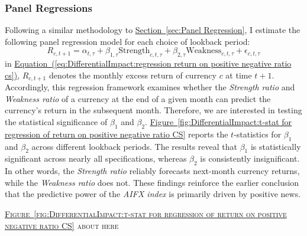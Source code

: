 \documentclass[12pt,oneside,letter]{article}
\newcommand*{\myfig}[1]{\hyperref[{#1}]{Figure~\ref*{#1}}}
\newcommand*{\mysec}[1]{\hyperref[{#1}]{Section~\ref*{#1}}}
\newcommand*{\myeq}[1]{\hyperref[{#1}]{Equation~(\ref*{#1})}}
\begin{document}
		\subsubsection{Panel Regressions}		\label{sec:Panel Regressions: Pos_neg_ratio}
		Following a similar methodology to \mysec{sec:Panel Regression}, I estimate the following panel regression model for each choice of lookback period:
		\begin{equation}
			R_{c,t+1} = \alpha_{t,\tau} +  \beta_{1,\tau} \text{Strength}_{c,t,\tau} + \beta_{2,\tau} \text{Weakness}_{c,t,\tau} + \epsilon_{c,t,\tau}
			\label{eq:DifferentialImpact:regression return on positive negative ratio cs}
		\end{equation}
		in \myeq{eq:DifferentialImpact:regression return on positive negative ratio cs}, \(R_{c,t+1}\) denotes the monthly excess return of currency \(c\) at time \(t+1\). Accordingly, this regression framework examines whether the \textit{Strength ratio} and \textit{Weakness ratio} of a currency at the end of a given month can predict the currency's return in the subsequent month. Therefore, we are interested in testing the statistical significance of \(\beta_1\) and \(\beta_2\). \myfig{fig:DifferentialImpact:t-stat for regression of return on positive negative ratio CS} reports the \(t\)-statistics for \(\beta_1\) and \(\beta_2\) across different lookback periods. The results reveal that \(\beta_1\) is statistically significant across nearly all specifications, whereas \(\beta_2\) is consistently insignificant. In other words, the \textit{Strength ratio} reliably forecasts next-month currency returns, while the \textit{Weakness ratio} does not. These findings reinforce the earlier conclusion that the predictive power of the \textit{AIFX index} is primarily driven by positive news.
		\begin{center}
			\textsc{\myfig{fig:DifferentialImpact:t-stat for regression of return on positive negative ratio CS} about here} \vspace{0cm}
		\end{center} 
\end{document}
